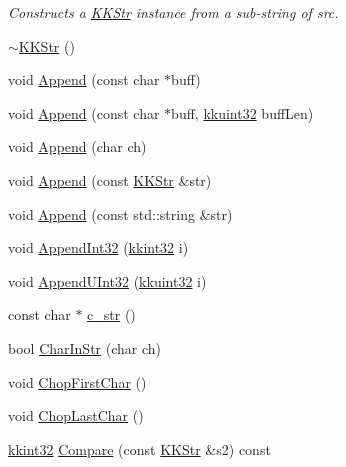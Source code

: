 \begin{DoxyCompactItemize}
\begin{DoxyCompactList}\small\item\em Constructs a \hyperlink{class_k_k_b_1_1_k_k_str}{K\+K\+Str} instance from a sub-\/string of \textquotesingle{}src\textquotesingle{}. \end{DoxyCompactList}\item 
\hyperlink{class_k_k_b_1_1_k_k_str_af0e7612fe32d3bd808a53306a9c2867b}{$\sim$\+K\+K\+Str} ()
\item 
void \hyperlink{class_k_k_b_1_1_k_k_str_ad23c5c4dccd6122f8629ce95b762f247}{Append} (const char $\ast$buff)
\item 
void \hyperlink{class_k_k_b_1_1_k_k_str_a602fc177199e924eb2bfa1d4bae53f0a}{Append} (const char $\ast$buff, \hyperlink{namespace_k_k_b_af8d832f05c54994a1cce25bd5743e19a}{kkuint32} buff\+Len)
\item 
void \hyperlink{class_k_k_b_1_1_k_k_str_aeb07a3bfcab67ece4de45db8c0926721}{Append} (char ch)
\item 
void \hyperlink{class_k_k_b_1_1_k_k_str_afef647573d936804a13fa6326308bd7a}{Append} (const \hyperlink{class_k_k_b_1_1_k_k_str}{K\+K\+Str} \&str)
\item 
void \hyperlink{class_k_k_b_1_1_k_k_str_aa46291fda014a52d9ff6172564b82730}{Append} (const std\+::string \&str)
\item 
void \hyperlink{class_k_k_b_1_1_k_k_str_a6e3f49d37d26231630827d19afa6007b}{Append\+Int32} (\hyperlink{namespace_k_k_b_a8fa4952cc84fda1de4bec1fbdd8d5b1b}{kkint32} i)
\item 
void \hyperlink{class_k_k_b_1_1_k_k_str_a919bae9344b110c0e5834e4bc469116d}{Append\+U\+Int32} (\hyperlink{namespace_k_k_b_af8d832f05c54994a1cce25bd5743e19a}{kkuint32} i)
\item 
const char $\ast$ \hyperlink{class_k_k_b_1_1_k_k_str_a1bffbae0abf7def0850251ed14ece34f}{c\+\_\+str} ()
\item 
bool \hyperlink{class_k_k_b_1_1_k_k_str_aca2830abe71e7a42fe6b0d2fc47053fc}{Char\+In\+Str} (char ch)
\item 
void \hyperlink{class_k_k_b_1_1_k_k_str_a974ed722249e4e96fde79d483a314712}{Chop\+First\+Char} ()
\item 
void \hyperlink{class_k_k_b_1_1_k_k_str_af84ac251b246a683f8b45c6c15a62936}{Chop\+Last\+Char} ()
\item 
\hyperlink{namespace_k_k_b_a8fa4952cc84fda1de4bec1fbdd8d5b1b}{kkint32} \hyperlink{class_k_k_b_1_1_k_k_str_a18c454e0b59c803aaac08262c99429f5}{Compare} (const \hyperlink{class_k_k_b_1_1_k_k_str}{K\+K\+Str} \&s2) const 

\end{DoxyCompactItemize}
